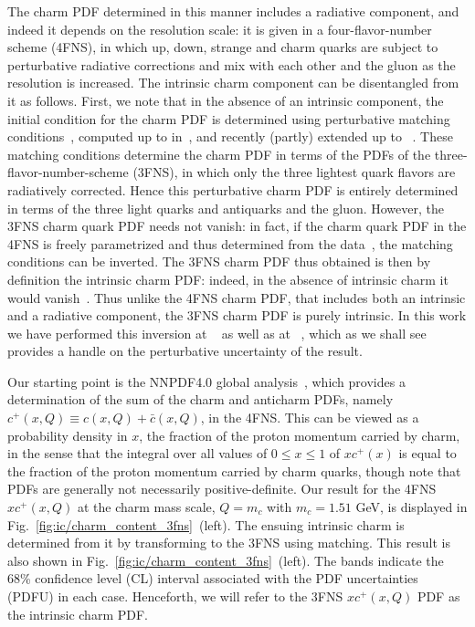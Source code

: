 The charm PDF determined in this manner includes a  radiative component, and
indeed it depends on the resolution scale: it is  given in a four-flavor-number
scheme (4FNS), in which up,  down, strange and charm quarks are subject to 
perturbative radiative corrections and mix with each other and the gluon as the
resolution is increased.
%
The intrinsic charm component can be disentangled from it as follows.
%
First, we note that in the absence of an intrinsic component, the initial
condition for the charm PDF is determined using perturbative matching
conditions~\cite{Collins:1986mp}, computed  up to \nnlo in~\cite{pdfnnlo},
and recently (partly) extended up to \nnnlo~\cite{Bierenbaum:2009zt,Bierenbaum:2009mv,Ablinger:2010ty,Ablinger:2014vwa,Ablinger:2014uka,Behring:2014eya,Ablinger_2014,Ablinger:2014nga,Blumlein:2017wxd}.
%
These matching conditions  determine the charm PDF in terms of the PDFs of the
three-flavor-number-scheme (3FNS), in which only the three lightest quark 
flavors are radiatively corrected.
%
Hence this perturbative charm PDF is entirely determined in terms of the three
light quarks and antiquarks and the gluon.
%
However, the 3FNS charm quark PDF needs not
vanish: in fact, if the charm quark PDF in the 4FNS is freely
parametrized and thus determined from the data~\cite{Ball:2015tna},
the matching conditions can be inverted.
%
The 3FNS charm PDF
thus obtained is then by definition the intrinsic charm PDF: indeed, in
the absence of intrinsic charm it would vanish~\cite{Ball:2015dpa}. 
Thus unlike the 4FNS charm PDF, that
includes both an intrinsic and a radiative
component, the 3FNS charm
PDF is purely intrinsic.
%
In this work we have performed this inversion at
\nnlo~\cite{pdfnnlo} as well as at \nnnlo~\cite{Bierenbaum:2009zt,Bierenbaum:2009mv,Ablinger:2010ty,Ablinger:2014vwa,Ablinger:2014uka,Behring:2014eya,Ablinger_2014,Ablinger:2014nga,Blumlein:2017wxd},
which as we shall see provides a handle on the perturbative uncertainty of the \nnlo result.

Our starting point is the NNPDF4.0 global
analysis~\cite{Ball:2021leu}, which provides a determination of
the sum of the charm and
anticharm PDFs, namely  $c^+(x,Q)\equiv c(x,Q)+\bar  c(x,Q)$, in the
4FNS. 
This can be viewed 
as a probability density in $x$, the fraction of the proton momentum
carried by charm, in the sense that the integral over all 
values of $0\le x\le1$ of 
$xc^+(x)$ is equal to  the fraction of
the proton momentum carried by charm quarks, though note that PDFs are
generally not necessarily positive-definite. 
%
Our result for  the 4FNS $xc^+(x,Q)$  at
the charm mass scale, $Q=m_c$ with $m_c=1.51$ GeV, 
is displayed in Fig.~\ref{fig:ic/charm_content_3fns}~(left).
%
%
The ensuing intrinsic charm is determined from it
by transforming to the 3FNS using
\nnlo matching.
%
This result is also shown 
in Fig.~\ref{fig:ic/charm_content_3fns}~(left).
The bands  indicate the 68\% confidence level (CL) interval
associated with the PDF uncertainties  (PDFU) in each case.  Henceforth, we will refer to
the  3FNS $xc^+(x,Q)$ PDF as the
intrinsic charm PDF. 

